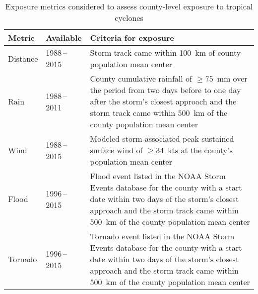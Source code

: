 \begin{table}%
\centering 
\caption{Exposure metrics considered to assess county-level exposure to 
tropical cyclones}
\begin{tabular}{p{1.5cm}p{2.5cm}p{10cm}} 
\toprule
Metric & Available & Criteria for exposure \\ \midrule 
Distance & 1988\,--\,2015 & Storm track came within 100~\si{\kilo\metre} of county population mean center\\ 
Rain & 1988\,--\,2011 & County cumulative rainfall of $\ge$75~\si{\milli\metre} over the period from two days before to 
one day after the storm's closest approach and the storm track came within 500~\si{\kilo\metre} of the county population mean center\\ 
Wind & 1988\,--\,2015 & Modeled storm-associated peak sustained surface wind of $\ge$34~kts 
at the county's population mean center\\ 
Flood & 1996\,--\,2015 & Flood event listed in the \ac{NOAA} Storm Events database for the county with a start date within two days of the storm's closest approach and the storm track came within 500~\si{\kilo\metre} of the county population mean center \\
Tornado & 1996\,--\,2015 & Tornado event listed in the \ac{NOAA} Storm Events database for the county with a start date within two days of the storm's closest approach and the storm track came within 500~\si{\kilo\metre} of the county population mean center\\
\bottomrule 
\end{tabular} 
\label{tab:exposuremetrics} 
\end{table}

\clearpage


